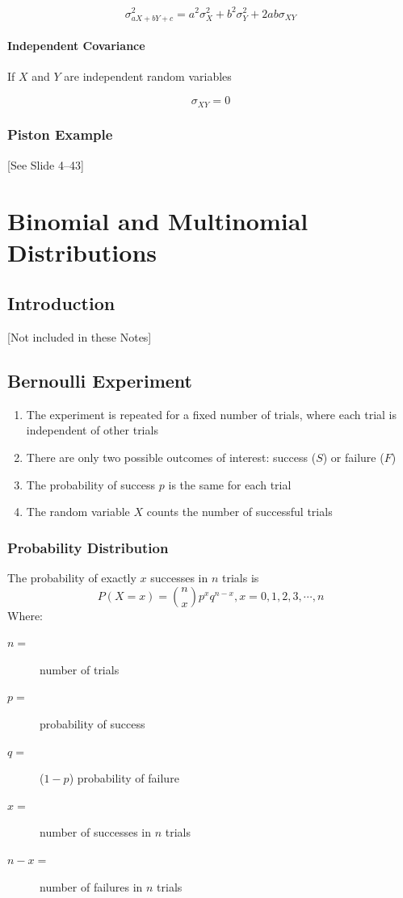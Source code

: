 \documentclass{book}
\begin{document}
$$\sigma^2_{aX+bY+c}=a^2\sigma^2_X+b^2\sigma^2_Y+2ab\sigma_{XY}$$

\subsubsection{Independent Covariance}
If $X$ and $Y$ are independent random variables

$$\sigma_{XY}=0$$

\subsection{Piston Example}
[See Slide 4--43]

\chapter{Binomial and Multinomial Distributions}

\section{Introduction}
[Not included in these Notes]

\section{Bernoulli Experiment}
\begin{enumerate}
\item The experiment is repeated for a fixed number of trials, where each trial is independent of other trials
\item There are only two possible outcomes of interest: success ($S$) or failure ($F$)
\item The probability of success $p$ is the same for each trial
\item The random variable $X$ counts the number of successful trials
\end{enumerate}

\subsection{Probability Distribution}
The probability of exactly $x$ successes in $n$ trials is
$$P(X=x)={n \choose x} p^xq^{n-x}, x = 0,1,2,3, \cdots,n$$
Where:
\begin{description}
\item [$n=$] number of trials
\item [$p=$] probability of success
\item [$q=$] ($1-p$) probability of failure
\item [$x=$] number of successes in $n$ trials
\item [$n-x=$] number of failures in $n$ trials
\end{description}
\end{document}
